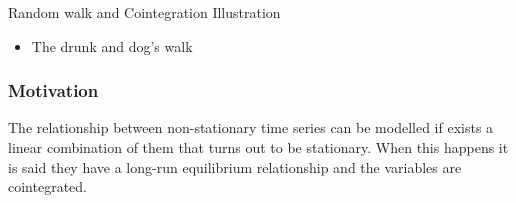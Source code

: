 \documentclass{beamer}
\begin{document}
\begin{frame}[t,fragile]{Random walk and Cointegration Illustration}
 \begin{itemize}
  \item The drunk and dog's walk
 \end{itemize}
    \begin{center}
    \end{center}
\end{frame}





\begin{frame}
\frametitle{Motivation}

The relationship between non-stationary time series can be modelled if exists a linear combination of them that turns out to be stationary.
When this happens it is said they have a long-run
equilibrium relationship and the variables are {\color{red} cointegrated}.
\

\end{frame}
\end{document}
